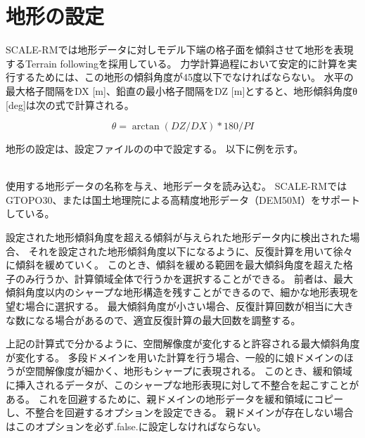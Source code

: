 \section{地形の設定} \label{sec:basic_topo}

SCALE-RMでは地形データに対しモデル下端の格子面を傾斜させて地形を表現するTerrain followingを採用している。
力学計算過程において安定的に計算を実行するためには、この地形の傾斜角度が45度以下でなければならない。
水平の最大格子間隔をDX [m]、鉛直の最小格子間隔をDZ [m]とすると、地形傾斜角度θ [deg]は次の式で計算される。

\[ \theta = \arctan( DZ/DX ) * 180/PI \]

地形の設定は、設定ファイルのの中で設定する。
以下に例を示す。

\\

使用する地形データの名称を与え、地形データを読み込む。
SCALE-RMではGTOPO30、または国土地理院による高精度地形データ（DEM50M）をサポートしている。

設定された地形傾斜角度を超える傾斜が与えられた地形データ内に検出された場合、
それを設定された地形傾斜角度以下になるように、反復計算を用いて徐々に傾斜を緩めていく。
このとき、傾斜を緩める範囲を最大傾斜角度を超えた格子のみ行うか、計算領域全体で行うかを選択することができる。
前者は、最大傾斜角度以内のシャープな地形構造を残すことができるので、細かな地形表現を望む場合に選択する。
最大傾斜角度が小さい場合、反復計算回数が相当に大きな数になる場合があるので、適宜反復計算の最大回数を調整する。

上記の計算式で分かるように、空間解像度が変化すると許容される最大傾斜角度が変化する。
多段ドメインを用いた計算を行う場合、一般的に娘ドメインのほうが空間解像度が細かく、地形もシャープに表現される。
このとき、緩和領域に挿入されるデータが、このシャープな地形表現に対して不整合を起こすことがある。
これを回避するために、親ドメインの地形データを緩和領域にコピーし、不整合を回避するオプションを設定できる。
親ドメインが存在しない場合はこのオプションを必ず.false.に設定しなければならない。
